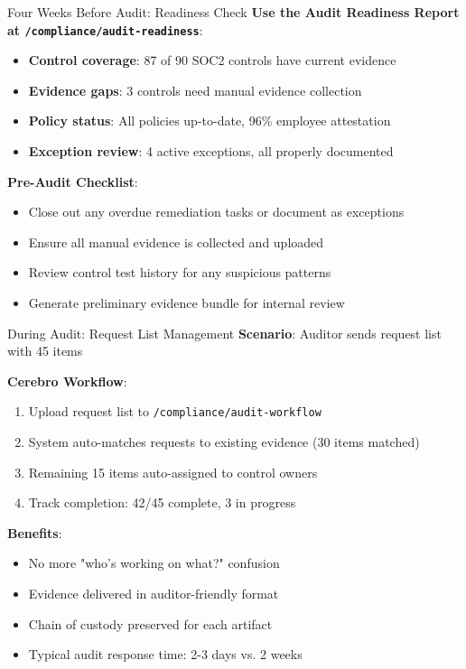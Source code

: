 \documentclass[aspectratio=169]{beamer}
\begin{document}
\begin{frame}{Four Weeks Before Audit: Readiness Check}
  \textbf{Use the Audit Readiness Report at \texttt{/compliance/audit-readiness}}:
  
  \vspace{0.3cm}
  
  \begin{itemize}
    \item \textbf{Control coverage}: 87 of 90 SOC2 controls have current evidence
    \item \textbf{Evidence gaps}: 3 controls need manual evidence collection
    \item \textbf{Policy status}: All policies up-to-date, 96\% employee attestation
    \item \textbf{Exception review}: 4 active exceptions, all properly documented
  \end{itemize}
  
  \vspace{0.3cm}
  
  \textbf{Pre-Audit Checklist}:
  \begin{itemize}
    \item Close out any overdue remediation tasks or document as exceptions
    \item Ensure all manual evidence is collected and uploaded
    \item Review control test history for any suspicious patterns
    \item Generate preliminary evidence bundle for internal review
  \end{itemize}
\end{frame}

\begin{frame}{During Audit: Request List Management}
  \textbf{Scenario}: Auditor sends request list with 45 items
  
  \vspace{0.3cm}
  
  \textbf{Cerebro Workflow}:
  \begin{enumerate}
    \item Upload request list to \texttt{/compliance/audit-workflow}
    \item System auto-matches requests to existing evidence (30 items matched)
    \item Remaining 15 items auto-assigned to control owners
    \item Track completion: 42/45 complete, 3 in progress
  \end{enumerate}
  
  \vspace{0.3cm}
  
  \textbf{Benefits}:
  \begin{itemize}
    \item No more "who's working on what?" confusion
    \item Evidence delivered in auditor-friendly format
    \item Chain of custody preserved for each artifact
    \item Typical audit response time: 2-3 days vs. 2 weeks
  \end{itemize}
\end{frame}
\end{document}

